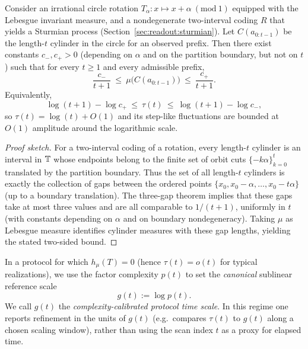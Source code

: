 \begin{proposition}[Sturmian cylinders have $\Theta(1/t)$ size (hence $\tau(t)=\log t+O(1)$)]\label{prop:sturmian-cylinder-theta}
Consider an irrational circle rotation $T_\alpha:x\mapsto x+\alpha\ (\mathrm{mod}\ 1)$ equipped with the Lebesgue invariant measure, and a nondegenerate two-interval coding $R$ that yields a Sturmian process (Section~\ref{sec:readout:sturmian}). Let $C(a_{0:t-1})$ be the length-$t$ cylinder in the circle for an observed prefix.
Then there exist constants $c_-,c_+>0$ (depending on $\alpha$ and on the partition boundary, but not on $t$) such that for every $t\ge 1$ and every admissible prefix,
\[
\frac{c_-}{t+1}\ \le\ \mu\bigl(C(a_{0:t-1})\bigr)\ \le\ \frac{c_+}{t+1}.
\]
Equivalently,
\[
\log(t+1)-\log c_+\ \le\ \tau(t)\ \le\ \log(t+1)-\log c_-,
\]
so $\tau(t)=\log(t)+O(1)$ and its step-like fluctuations are bounded at $O(1)$ amplitude around the logarithmic scale.
\end{proposition}

\begin{proof}[Proof sketch]
For a two-interval coding of a rotation, every length-$t$ cylinder is an interval in $\mathbb{T}$ whose endpoints belong to the finite set of orbit cuts $\{-k\alpha\}_{k=0}^{t}$ translated by the partition boundary. Thus the set of all length-$t$ cylinders is exactly the collection of gaps between the ordered points $\{x_0, x_0-\alpha,\dots,x_0-t\alpha\}$ (up to a boundary translation). The three-gap theorem implies that these gaps take at most three values and are all comparable to $1/(t+1)$, uniformly in $t$ (with constants depending on $\alpha$ and on boundary nondegeneracy).\cite{KuipersNiederreiter1974}
Taking $\mu$ as Lebesgue measure identifies cylinder measures with these gap lengths, yielding the stated two-sided bound.
\end{proof}

\begin{definition}\label{def:complexity-time}
In a protocol for which $h_\mu(T)=0$ (hence $\tau(t)=o(t)$ for typical realizations), we use the factor complexity $p(t)$ to set the \emph{canonical} sublinear reference scale
\[
g(t):=\log p(t).
\]
We call $g(t)$ the \emph{complexity-calibrated protocol time scale}. In this regime one reports refinement in the units of $g(t)$ (e.g.\ compares $\tau(t)$ to $g(t)$ along a chosen scaling window), rather than using the scan index $t$ as a proxy for elapsed time.
\end{definition}

